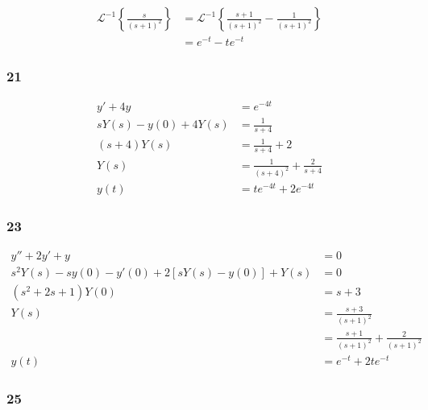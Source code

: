 \documentclass{article}
\begin{document}
\begin{align*}
  \mathcal{L}^{-1} \left\{ \frac{s}{(s + 1)^2} \right\} & = \mathcal{L}^{-1} \left\{ \frac{s + 1}{(s + 1)^2} - \frac{1}{(s + 1)^2} \right\} \\
                                                        & = e^{-t} - t e^{-t}
\end{align*}

\subsubsection{21}

\begin{align*}
  y' + 4 y               & = e^{-4 t}                              \\
  s Y(s) - y(0) + 4 Y(s) & = \frac{1}{s + 4}                       \\
  (s + 4) Y(s)           & = \frac{1}{s + 4} + 2                   \\
  Y(s)                   & = \frac{1}{(s + 4)^2} + \frac{2}{s + 4} \\
  y(t)                   & = t e^{-4 t} + 2 e^{-4 t}
\end{align*}

\subsubsection{23}

\begin{align*}
  y'' + 2 y' + y                                       & = 0                                             \\
  s^2 Y(s) - s y(0) - y'(0) + 2 [s Y(s) - y(0)] + Y(s) & = 0                                             \\
  (s^2 + 2 s + 1) Y(0)                                 & = s + 3                                         \\
  Y(s)                                                 & = \frac{s + 3}{(s + 1)^2}                       \\
                                                       & = \frac{s + 1}{(s + 1)^2} + \frac{2}{(s + 1)^2} \\
  y(t)                                                 & = e^{-t} + 2 t e^{-t}
\end{align*}

\subsubsection{25}
\end{document}
